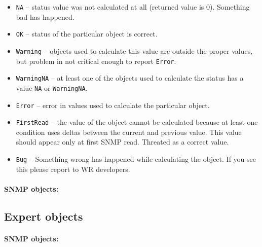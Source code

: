 \begin{itemize}%
  \item \texttt{NA} -- status value was not calculated at all (returned value
    is 0). Something bad has happened.
  \item \texttt{OK} -- status of the particular object is correct.
  \item \texttt{Warning} -- objects used to calculate this value are outside the
    proper values, but problem in not critical enough to report \texttt{Error}.
  \item \texttt{WarningNA} -- at least one of the objects used to calculate the
    status has a value \texttt{NA} or \texttt{WarningNA}.
  \item \texttt{Error} -- error in values used to calculate the particular
    object.
  \item \texttt{FirstRead} -- the value of the object cannot be calculated
    because at least one condition uses deltas between the current and previous
    value. This value should appear only at first SNMP read. Threated as a
    correct value.
  \item \texttt{Bug} -- Something wrong has happened while calculating the
    object. If you see this please report to WR developers.
\end{itemize}

\paragraph*{SNMP objects:}

\printnoidxglossary[type=snmp_status,title=,style=objtree,sort=def]

\newpage
\subsection{Expert objects}
\label{sec:snmp_exports:expert}

\paragraph*{SNMP objects:}

\printnoidxglossary[type=snmp_expert,style=objtree,sort=def]


